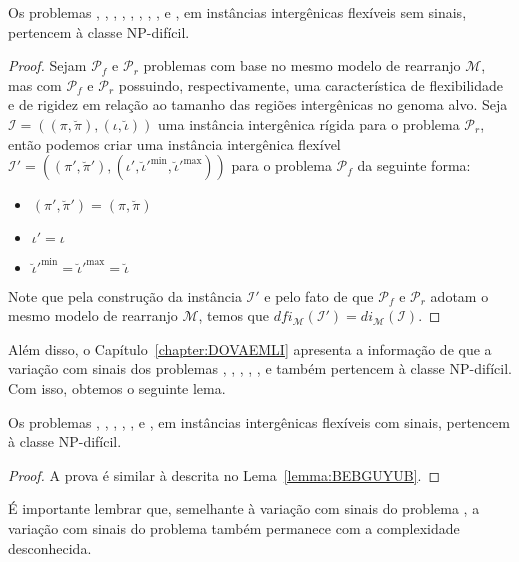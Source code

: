 \begin{lemma}\label{lemma:BEBGUYUB}
Os problemas \SbFIR{}, \SbFIRI{}, \SbFIRM{}, \SbFIRMI{}, \SbFIRT{}, \SbFIRTI{}, \SbFIRTM{}, \SbFIRTMI{}, \SbFIT{} e \SbFITM{}, em instâncias intergênicas flexíveis sem sinais, pertencem à classe NP-difícil.
\end{lemma}
\begin{proof}
Sejam $\mathcal{P}_f$ e $\mathcal{P}_r$ problemas com base no mesmo modelo de rearranjo $\mathcal{M}$, mas com $\mathcal{P}_f$ e $\mathcal{P}_r$ possuindo, respectivamente, uma característica de flexibilidade e de rigidez em relação ao tamanho das regiões intergênicas no genoma alvo. Seja $\mathcal{I}=((\pi,\breve\pi),(\iota,\breve\iota))$ uma instância intergênica rígida para o problema $\mathcal{P}_r$, então podemos criar uma instância intergênica flexível $\mathcal{I'} = ((\pi',\breve\pi'),(\iota',\breve\iota'^{\min},\breve\iota'^{\max}))$ para o problema $\mathcal{P}_f$ da seguinte forma:
\begin{itemize}
  \item $(\pi',\breve\pi') = (\pi,\breve\pi)$
  \item $\iota' = \iota$
  \item $\breve\iota'^{\min} = \breve\iota'^{\max} = \breve\iota$
\end{itemize}
Note que pela construção da instância $\mathcal{I'}$ e pelo fato de que $\mathcal{P}_f$ e $\mathcal{P}_r$ adotam o mesmo modelo de rearranjo $\mathcal{M}$, temos que $dfi_{\mathcal{M}}(\mathcal{I'}) = di_{\mathcal{M}}(\mathcal{I})$.
\end{proof}

Além disso, o Capítulo~\ref{chapter:DOVAEMLI} apresenta a informação de que a variação com sinais dos problemas \SbIR{}, \SbIRM{}, \SbIRMI{}, \SbIRT{}, \SbIRTI{}, \SbIRTM{} e \SbIRTMI{} também pertencem à classe NP-difícil. Com isso, obtemos o seguinte lema.

\begin{lemma}\label{lemma:XPRZJZES}
Os problemas \SbFIR{}, \SbFIRM{}, \SbFIRMI{}, \SbFIRT{}, \SbFIRTI{}, \SbFIRTM{} e \SbFIRTMI{}, em instâncias intergênicas flexíveis com sinais, pertencem à classe NP-difícil.
\end{lemma}
\begin{proof}
A prova é similar à descrita no Lema~\ref{lemma:BEBGUYUB}.
\end{proof}

É importante lembrar que, semelhante à variação com sinais do problema \SbIRI{}, a variação com sinais do problema \SbFIRI{} também permanece com a complexidade desconhecida.

